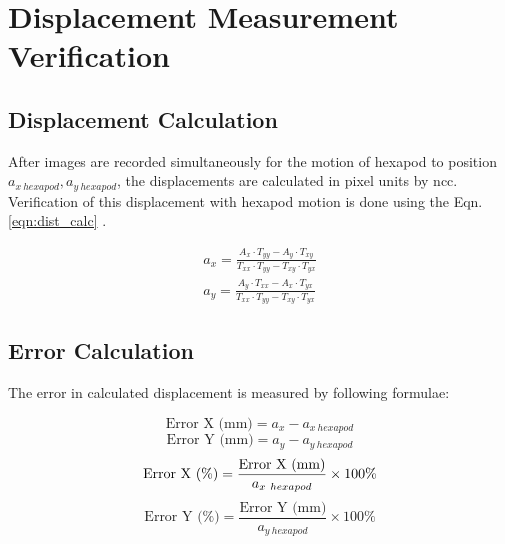     
    \section{Displacement Measurement Verification}
        \subsection*{Displacement Calculation}
            \noindent After images are recorded simultaneously for the motion of hexapod to position \(a_{x\ hexapod}, a_{y\ hexapod}\), the displacements are calculated in pixel units by \gls{ncc}. Verification of this displacement with hexapod motion is done using the Eqn. \ref{eqn:dist_calc} \cite{charrett_2018}. 

            \begin{equation}\label{eqn:dist_calc}
                \begin{aligned}
                    a_x = \frac{A_x \cdot T_{yy} - A_y \cdot T_{xy}}{T_{xx} \cdot T_{yy} - T_{xy} \cdot T_{yx}} \\
                    a_y = \frac{A_y \cdot T_{xx} - A_x \cdot T_{yx}}{T_{xx} \cdot T_{yy} - T_{xy} \cdot T_{yx}}
                \end{aligned}
            \end{equation}

        \subsection*{Error Calculation}
            The error in calculated displacement is measured by following formulae:
            

            \begin{equation}
                \text{Error X (mm)} = a_x - a_{x\ hexapod}
            \end{equation}
            \begin{equation}
                \text{Error Y (mm)} = a_y - a_{y\ hexapod}
            \end{equation}
            \begin{equation}
                \text{Error X (\%)} = \frac{\text{Error X (mm)}}{a_{x\ hexapod}} \times 100\% \\
            \end{equation}
            \begin{equation}
                \text{Error Y (\%)} = \frac{\text{Error Y (mm)}}{a_{y\ hexapod}} \times 100\%
            \end{equation}


